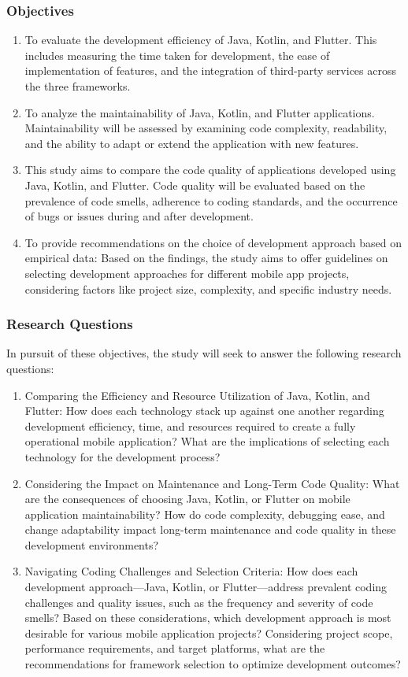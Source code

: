 \subsubsection*{Objectives}
\begin{enumerate}
    \item To evaluate the development efficiency of Java, Kotlin, and Flutter. This includes measuring the time taken for development, the ease of implementation of features, and the integration of third-party services across the three frameworks.
    \item To analyze the maintainability of Java, Kotlin, and Flutter applications.  Maintainability will be assessed by examining code complexity, readability, and the ability to adapt or extend the application with new features.
    \item This study aims to compare the code quality of applications developed using Java, Kotlin, and Flutter. Code quality will be evaluated based on the prevalence of code smells, adherence to coding standards, and the occurrence of bugs or issues during and after development.
    \item To provide recommendations on the choice of development approach based on empirical data: Based on the findings, the study aims to offer guidelines on selecting development approaches for different mobile app projects, considering factors like project size, complexity, and specific industry needs.
\end{enumerate}
\subsubsection*{Research Questions}
In pursuit of these objectives, the study will seek to answer the following research questions:
\begin{enumerate}
    \item Comparing the Efficiency and Resource Utilization of Java, Kotlin, and Flutter: How does each technology stack up against one another regarding development efficiency, time, and resources required to create a fully operational mobile application? What are the implications of selecting each technology for the development process?
    \item Considering the Impact on Maintenance and Long-Term Code Quality: What are the consequences of choosing Java, Kotlin, or Flutter on mobile application maintainability? How do code complexity, debugging ease, and change adaptability impact long-term maintenance and code quality in these development environments?
    \item Navigating Coding Challenges and Selection Criteria: How does each development approach—Java, Kotlin, or Flutter—address prevalent coding challenges and quality issues, such as the frequency and severity of code smells? Based on these considerations, which development approach is most desirable for various mobile application projects? Considering project scope, performance requirements, and target platforms, what are the recommendations for framework selection to optimize development outcomes?
\end{enumerate}

